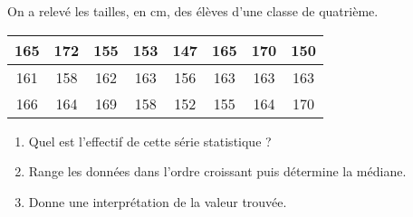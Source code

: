 
On a relevé les tailles, en cm, des élèves d'une classe de quatrième.

\begin{tabular}{|c|c|c|c|c|c|c|c|}
\hline 
165 & 172 & 155 & 153 & 147 & 165 & 170 & 150  \\ 
\hline 
161 & 158 & 162 & 163 & 156 & 163 & 163 & 163  \\ 
\hline 
166 & 164 & 169 & 158 & 152 & 155 & 164 & 170  \\ 
\hline 
\end{tabular} 

\begin{enumerate}
\item Quel est l'effectif de cette série statistique ?
\item Range les données dans l'ordre croissant puis détermine la médiane.
\item Donne une interprétation de la valeur trouvée.
\end{enumerate}